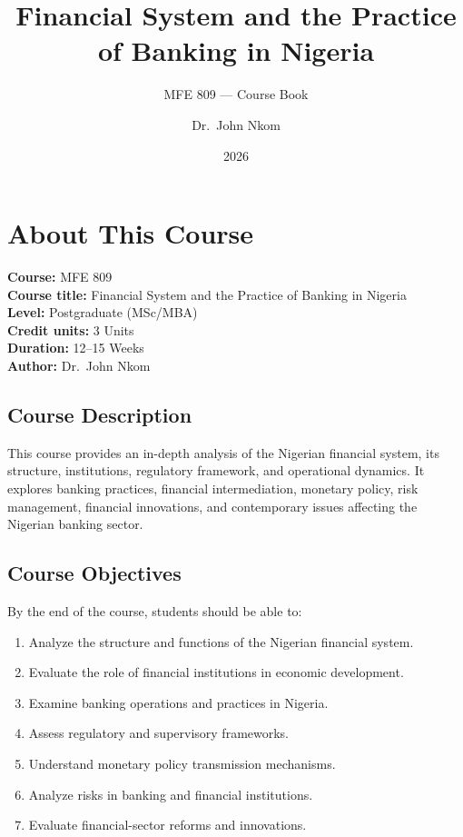 \documentclass[
]{article}
\title{Financial System and the Practice of Banking in Nigeria}
\subtitle{MFE 809 --- Course Book}
\author{Dr.~John Nkom}
\date{2026}
\providecommand{\tightlist}{%
  \setlength{\itemsep}{0pt}\setlength{\parskip}{0pt}}
\begin{document}
\maketitle

{
\setcounter{tocdepth}{2}
\tableofcontents
}
\section{About This Course}\label{about-this-course}

\textbf{Course:} MFE 809\\
\textbf{Course title:} Financial System and the Practice of Banking in Nigeria\\
\textbf{Level:} Postgraduate (MSc/MBA)\\
\textbf{Credit units:} 3 Units\\
\textbf{Duration:} 12--15 Weeks\\
\textbf{Author:} Dr.~John Nkom

\subsection{Course Description}\label{course-description}

This course provides an in-depth analysis of the Nigerian financial system, its structure, institutions, regulatory framework, and operational dynamics. It explores banking practices, financial intermediation, monetary policy, risk management, financial innovations, and contemporary issues affecting the Nigerian banking sector.

\subsection{Course Objectives}\label{course-objectives}

By the end of the course, students should be able to:

\begin{enumerate}
\def\labelenumi{\arabic{enumi}.}
\tightlist
\item
  Analyze the structure and functions of the Nigerian financial system.
\item
  Evaluate the role of financial institutions in economic development.
\item
  Examine banking operations and practices in Nigeria.
\item
  Assess regulatory and supervisory frameworks.
\item
  Understand monetary policy transmission mechanisms.
\item
  Analyze risks in banking and financial institutions.
\item
  Evaluate financial-sector reforms and innovations.
\end{enumerate}
\end{document}
